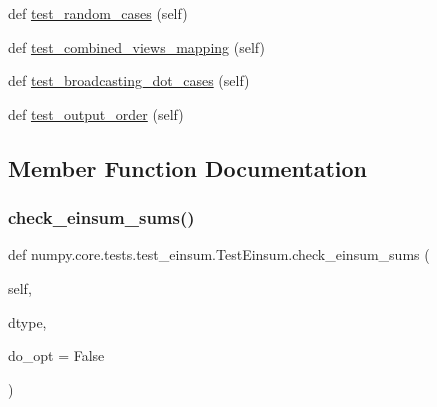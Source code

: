 \begin{DoxyCompactItemize}
def \hyperlink{classnumpy_1_1core_1_1tests_1_1test__einsum_1_1TestEinsum_abef2aed6938bd1d9110be3df891bd71c}{test\+\_\+random\+\_\+cases} (self)
\item 
def \hyperlink{classnumpy_1_1core_1_1tests_1_1test__einsum_1_1TestEinsum_a4a6b1b674c4b0da6cd18614d57f9ced9}{test\+\_\+combined\+\_\+views\+\_\+mapping} (self)
\item 
def \hyperlink{classnumpy_1_1core_1_1tests_1_1test__einsum_1_1TestEinsum_a3953b1cc9848a332475d17fdf08c26c3}{test\+\_\+broadcasting\+\_\+dot\+\_\+cases} (self)
\item 
def \hyperlink{classnumpy_1_1core_1_1tests_1_1test__einsum_1_1TestEinsum_a68a720fbee74020a395dc40c92b30e1f}{test\+\_\+output\+\_\+order} (self)
\end{DoxyCompactItemize}


\subsection{Member Function Documentation}
\mbox{\label{classnumpy_1_1core_1_1tests_1_1test__einsum_1_1TestEinsum_a00a512085bb380792a01cc8f697d56e3}} 
\subsubsection{\texorpdfstring{check\+\_\+einsum\+\_\+sums()}{check\_einsum\_sums()}}
{\footnotesize\ttfamily def numpy.\+core.\+tests.\+test\+\_\+einsum.\+Test\+Einsum.\+check\+\_\+einsum\+\_\+sums (\begin{DoxyParamCaption}\item[{}]{self,  }\item[{}]{dtype,  }\item[{}]{do\+\_\+opt = {\ttfamily False} }\end{DoxyParamCaption})}

\mbox{\label{classnumpy_1_1core_1_1tests_1_1test__einsum_1_1TestEinsum_ad2726e76355864980bd8b3473e11838d}} 

